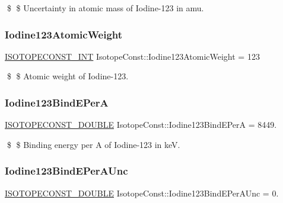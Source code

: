 \$ \$ Uncertainty in atomic mass of Iodine-\/123 in amu. \mbox{\label{group___isotope_const-_iodine-_i123_gad55c3620733826b0dccbed8690d6364b}} 
\subsubsection{\texorpdfstring{Iodine123\+Atomic\+Weight}{Iodine123AtomicWeight}}
{\footnotesize\ttfamily \mbox{\hyperlink{group___isotope_const-_macros_ga5f18360b3e99483a35c32d789e62621c}{I\+S\+O\+T\+O\+P\+E\+C\+O\+N\+S\+T\+\_\+\+I\+NT}} Isotope\+Const\+::\+Iodine123\+Atomic\+Weight = 123}

\$ \$ Atomic weight of Iodine-\/123. \mbox{\label{group___isotope_const-_iodine-_i123_ga54ef44b5077f384fe2d5ae6127933c7e}} 
\subsubsection{\texorpdfstring{Iodine123\+Bind\+E\+PerA}{Iodine123BindEPerA}}
{\footnotesize\ttfamily \mbox{\hyperlink{group___isotope_const-_macros_ga8f45a7272ce02c0b4c65c44636ed719a}{I\+S\+O\+T\+O\+P\+E\+C\+O\+N\+S\+T\+\_\+\+D\+O\+U\+B\+LE}} Isotope\+Const\+::\+Iodine123\+Bind\+E\+PerA = 8449.}

\$ \$ Binding energy per A of Iodine-\/123 in keV. \mbox{\label{group___isotope_const-_iodine-_i123_ga41f485e9ff870b0d8ea55a97c5feddcc}} 
\subsubsection{\texorpdfstring{Iodine123\+Bind\+E\+Per\+A\+Unc}{Iodine123BindEPerAUnc}}
{\footnotesize\ttfamily \mbox{\hyperlink{group___isotope_const-_macros_ga8f45a7272ce02c0b4c65c44636ed719a}{I\+S\+O\+T\+O\+P\+E\+C\+O\+N\+S\+T\+\_\+\+D\+O\+U\+B\+LE}} Isotope\+Const\+::\+Iodine123\+Bind\+E\+Per\+A\+Unc = 0.}

